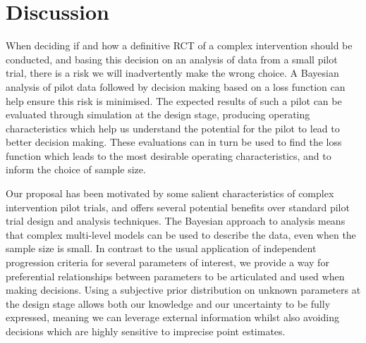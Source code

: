 \documentclass[AMA,STIX1COL]{WileyNJD-v2}
\begin{document}
\section{Discussion}\label{sec:discussion}




When deciding if and how a definitive RCT of a complex intervention should be conducted, and basing this decision on an analysis of data from a small pilot trial, there is a risk we will inadvertently make the wrong choice. A Bayesian analysis of pilot data followed by decision making based on a loss function can help ensure this risk is minimised. The expected results of such a pilot can be evaluated through simulation at the design stage, producing operating characteristics which help us understand the potential for the pilot to lead to better decision making. These evaluations can in turn be used to find the loss function which leads to the most desirable operating characteristics, and to inform the choice of sample size.

Our proposal has been motivated by some salient characteristics of complex intervention pilot trials, and offers several potential benefits over standard pilot trial design and analysis techniques. The Bayesian approach to analysis means that complex multi-level models can be used to describe the data, even when the sample size is small. In contrast to the usual application of independent progression criteria for several parameters of interest, we provide a way for preferential relationships between parameters to be articulated and used when making decisions. Using a subjective prior distribution on unknown parameters at the design stage allows both our knowledge and our uncertainty to be fully expressed, meaning we can leverage external  information whilst also avoiding decisions which are highly sensitive to imprecise point estimates.
\end{document}
